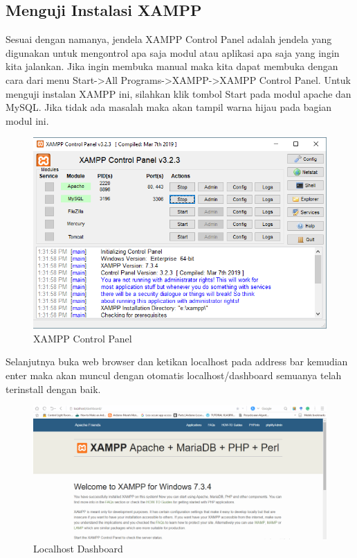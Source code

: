 \subsection{Menguji Instalasi XAMPP}
Sesuai dengan namanya, jendela XAMPP Control Panel adalah jendela yang digunakan untuk mengontrol apa saja modul atau aplikasi apa saja yang ingin kita jalankan. Jika ingin membuka manual maka kita dapat membuka dengan cara dari menu Start->All Programs->XAMPP->XAMPP Control Panel. Untuk menguji instalan XAMPP ini, silahkan klik tombol Start pada modul apache dan MySQL. Jika tidak ada masalah maka akan tampil warna hijau pada bagian modul ini.

\begin{figure}[h]
\centering
\includegraphics[scale=0.5]{figures/controlpanel}
\caption{XAMPP Control Panel}
\end{figure}

Selanjutnya buka web browser dan ketikan localhost pada address bar kemudian enter maka akan muncul dengan otomatis localhost/dashboard semuanya telah terinstall dengan baik.

\begin{figure}[h]
\centering
\includegraphics[scale=0.3]{figures/dashboard}
\caption{Localhost Dashboard}
\end{figure}


